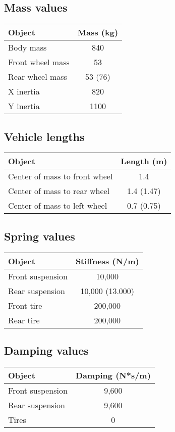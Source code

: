 \subsection{Mass values}
\begin{center}
\begin{tabular}{| l | c |}
\hline
Object & Mass (kg) \\
\hline
Body mass & 840 \\
Front wheel mass & 53 \\
Rear wheel mass & 53 (76) \\
X inertia & 820 \\
Y inertia & 1100 \\
\hline
\end{tabular}
\end{center}


\subsection{Vehicle lengths}
\begin{center}
\begin{tabular}{| l | c |}
\hline
Object & Length (m) \\
\hline
Center of mass to front wheel & 1.4 \\
Center of mass to rear wheel & 1.4 (1.47) \\
Center of mass to left wheel & 0.7 (0.75) \\
\hline
\end{tabular}
\end{center}

\subsection{Spring values}
\begin{center}
\begin{tabular}{| l | c |}
\hline
Object & Stiffness (N/m) \\
\hline
Front suspension & 10,000 \\
Rear suspension & 10,000 (13.000) \\
Front tire & 200,000 \\
Rear tire & 200,000 \\
\hline
\end{tabular}
\end{center}

\subsection{Damping values}
\begin{center}
\begin{tabular}{| l | c |}
\hline
Object & Damping (N*s/m) \\
\hline
Front suspension & 9,600 \\
Rear suspension & 9,600 \\
Tires & 0 \\
\hline
\end{tabular}
\end{center}


